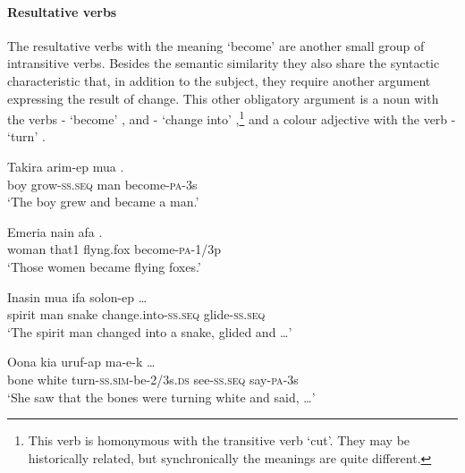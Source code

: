 \paragraph{Resultative verbs}\label{sec:3.8.4.4.4}
{}
The resultative verbs with the meaning `become' are another small group of intransitive verbs. Besides the semantic similarity they also share the syntactic characteristic that, in addition to the subject, they require another argument expressing the result of change. This other obligatory argument is a noun with the verbs - `become' ,  and - `change into' ,\footnote{This verb is homonymous with the transitive verb  `cut'. They may be historically related, but synchronically the meanings are quite different.} and a colour adjective with the verb - `turn' . 

\ea%
\label{ex:3:x276}
\gll Takira arim-ep mua . \\
boy grow-\textsc{ss}.\textsc{seq} man become-\textsc{pa}-3s \\
\glt`The boy grew and became a man.'
\z

\ea%
\label{ex:3:x277}
\gll Emeria nain afa . \\
woman that1 flyng.fox become-\textsc{pa}-1/3p \\
\glt`Those women became flying foxes.'
\z

\ea%
\label{ex:3:x278}
\gll Inasin mua ifa  solon-ep {\dots} \\
spirit man snake change.into-\textsc{ss}.\textsc{seq} glide-\textsc{ss}.\textsc{seq} \\
\glt`The spirit man changed into a snake, glided and {\dots}'
\z

\ea%
\label{ex:3:x279}
\gll Oona kia  uruf-ap ma-e-k {\dots} \\
bone white turn-\textsc{ss}.\textsc{sim}-be-2/3s.\textsc{ds} see-\textsc{ss}.\textsc{seq} say-\textsc{pa}-3s \\
\glt`She saw that the bones were turning white and said, {\dots}'
\z

